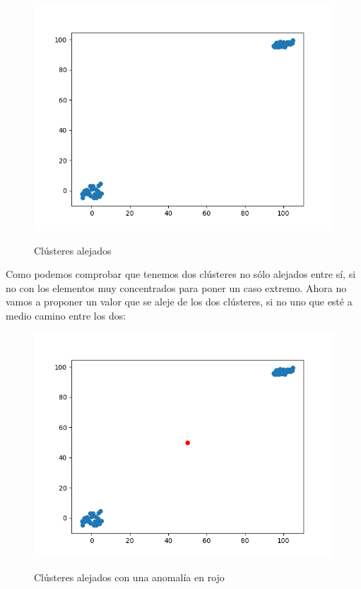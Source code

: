 \begin{figure}[H]
	\centering
	\includegraphics[scale=0.5]{imagenes/clusters}
	\label{clusters}
	\caption{Clústeres alejados}
\end{figure}

Como podemos comprobar que tenemos dos clústeres no sólo alejados entre sí, si no con los elementos muy concentrados para poner un caso extremo. Ahora no vamos a proponer un valor que se aleje de los dos clústeres, si no uno que esté a medio camino entre los dos:

\begin{figure}[H]
	\centering
	\includegraphics[scale=0.5]{imagenes/outlier_cluster}
	\label{outlier_clusters}
	\caption{Clústeres alejados con una anomalía en rojo}
\end{figure}

